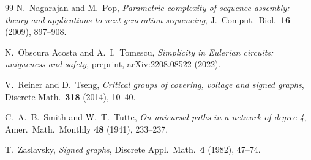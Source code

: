 \documentclass[11pt]{article}
\theoremstyle{plain}
\theoremstyle{definition}
\theoremstyle{remark}
\begin{document}
\begin{thebibliography}{99}
 N.~Nagarajan and M.~Pop,
\emph{Parametric complexity of sequence assembly: theory and applications to next
generation sequencing}, J.\ Comput.\ Biol.\ \textbf{16} (2009), 897--908.

 N.~Obscura Acosta and A.~I.~Tomescu,
\emph{Simplicity in Eulerian circuits: uniqueness and safety},
preprint, arXiv:2208.08522 (2022).

 V.~Reiner and D.~Tseng,
\emph{Critical groups of covering, voltage and signed graphs},
Discrete Math.\ \textbf{318} (2014), 10--40.

 C.~A.~B.~Smith and W.~T.~Tutte,
\emph{On unicursal paths in a network of degree 4},
Amer.\ Math.\ Monthly \textbf{48} (1941), 233--237.

 T.~Zaslavsky,
\emph{Signed graphs},
Discrete Appl.\ Math.\ \textbf{4} (1982), 47--74.

\end{thebibliography}
\end{document}

